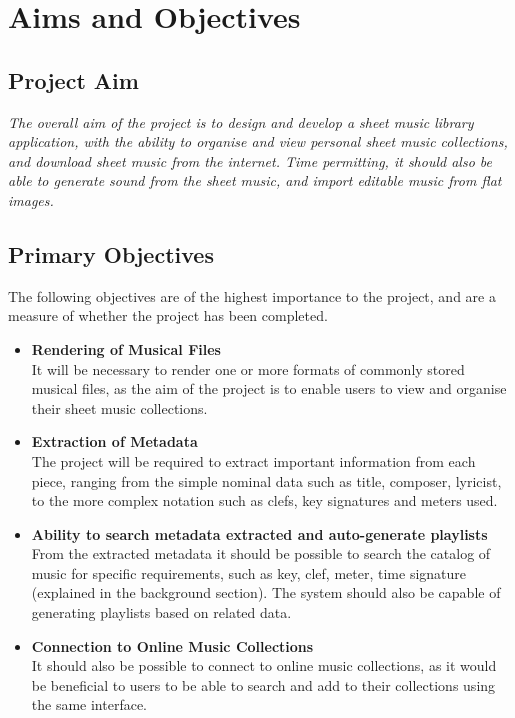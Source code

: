 \section{Aims and Objectives}
\subsection{Project Aim}
\begin{center}
\textit{The overall aim of the project is to design and develop a sheet music library application, with the ability to organise and view personal sheet music collections, and download sheet music from the internet. Time permitting, it should also be able to generate sound from the sheet music, and import editable music from flat images.}
\end{center}
\subsection{Primary Objectives}
The following objectives are of the highest importance to the project, and are a measure of whether the project has been completed.
\begin{itemize}
    \item \textbf{Rendering of Musical Files}\\
    It will be necessary to render one or more formats of commonly stored musical files, as the aim of the project is to enable users to view and organise their sheet music collections.
    \item \textbf{Extraction of Metadata}\\
    The project will be required to extract important information from each piece, ranging from the simple nominal data such as title, composer, lyricist, to the more complex notation such as clefs, key signatures and meters used. 
    \item \textbf{Ability to search metadata extracted and auto-generate playlists}\\ From the extracted metadata it should be possible to search the catalog of music for specific requirements, such as key, clef, meter, time signature (explained in the background section). The system should also be capable of generating playlists based on related data.
    \item \textbf{Connection to Online Music Collections}\\
    It should also be possible to connect to online music collections, as it would be beneficial to users to be able to search and add to their collections using the same interface.

\end{itemize}
